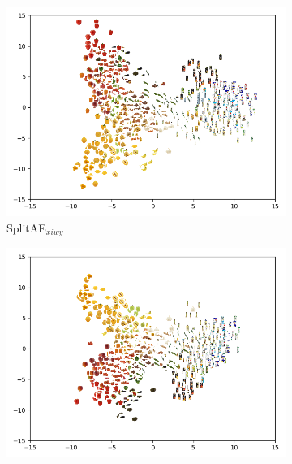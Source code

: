 
\begin{figure}[t]
     \centering
     \begin{subfigure}[b]{0.45\textwidth}
         \centering
         \includegraphics[width=\textwidth]{PaperB/figures_and_tables/latent_space_visualizations/splitae_vcca_comparison/pca_latents_splitae_xiwy_seed2.png}
         \caption{SplitAE$_{xiwy}$}
         \label{fig:splitae_xiwy_comparison}
     \end{subfigure}
     \begin{subfigure}[b]{0.45\textwidth}
         \centering
         \includegraphics[width=\textwidth]{PaperB/figures_and_tables/latent_space_visualizations/splitae_vcca_comparison/pca_latents_vcca_xiwy_seed2.png}

\end{subfigure}
\end{figure}
